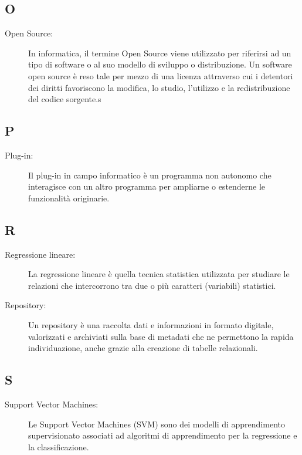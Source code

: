 \documentclass[../manuale-utente.tex]{subfiles}
\begin{document}
\subsection*{O}
\begin{description}
  \item[Open Source:] In informatica, il termine Open Source viene utilizzato per riferirsi ad un tipo di software o al suo modello di sviluppo o distribuzione. Un software open source è reso tale per mezzo di una licenza attraverso cui i detentori dei diritti favoriscono la modifica, lo studio, l'utilizzo e la redistribuzione del codice sorgente.s
\end{description}

\subsection*{P}
\begin{description}
  \item[Plug-in:] Il plug-in in campo informatico è un programma non autonomo che interagisce con un altro programma per ampliarne o estenderne le funzionalità originarie.
\end{description}

\subsection*{R}
\begin{description}
  \item[Regressione lineare:] La regressione lineare è quella tecnica statistica utilizzata per studiare le relazioni che intercorrono tra due o più caratteri (variabili) statistici.
  \item[Repository:] Un repository è una raccolta dati e informazioni in formato digitale, valorizzati e archiviati sulla base di metadati che ne permettono la rapida individuazione, anche grazie alla creazione di tabelle relazionali.
\end{description}

\subsection*{S}
\begin{description}
  \item[Support Vector Machines:] Le Support Vector Machines (SVM) sono dei modelli di apprendimento supervisionato associati ad algoritmi di apprendimento per la regressione e la classificazione.
\end{description}
\end{document}
